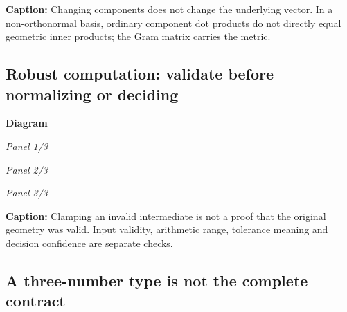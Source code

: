 \hypertarget{appendix-38d9c8aca357-coordinate-frame-same-movement-different-coordinates}{}


\textbf{Caption:} Changing components does not change the underlying vector. In a non-orthonormal basis, ordinary component dot products do not directly equal geometric inner products; the Gram matrix carries the metric.

\subsection{Robust computation: validate before normalizing or deciding}\label{appendix-38d9c8aca357-robust-computation-validate-before-normalizing-or-deciding}

\hypertarget{appendix-38d9c8aca357-robust-computation-validate-before-normalizing-or-deciding}{}

\par\medskip\noindent\textbf{Diagram}\par
\par\noindent\textit{Panel 1/3}\par{}\par
\par\noindent\textit{Panel 2/3}\par{}\par
\par\noindent\textit{Panel 3/3}\par{}\par

\textbf{Caption:} Clamping an invalid intermediate is not a proof that the original geometry was valid. Input validity, arithmetic range, tolerance meaning and decision confidence are separate checks.

\subsection{A three-number type is not the complete contract}\label{appendix-38d9c8aca357-a-three-number-type-is-not-the-complete-contract}

